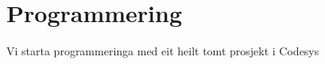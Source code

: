 \chapter{Programmering}
\thispagestyle{fancy}
Vi starta programmeringa med eit heilt tomt prosjekt i \gls{Codesys}
